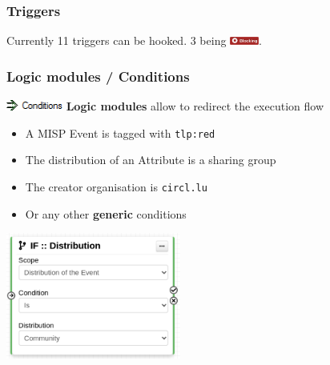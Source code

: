 \begin{frame}
    \frametitle{Triggers}
    Currently 11 triggers can be hooked. 3 being \includegraphics[width=36px]{pictures/blocking-workflow.png}.
    \begin{center}
    \end{center}
\end{frame}

\begin{frame}
    \frametitle{Logic modules / Conditions}
    \vspace*{0.25em}
    \includegraphics[width=70px]{pictures/sc-condition.png}
    \vspace*{0.25em}
    {\Large {}} \textbf{Logic modules} allow to redirect the execution flow
    \begin{itemize}
        \item A MISP Event is tagged with \texttt{tlp:red}
        \item The distribution of an Attribute is a sharing group
        \item The creator organisation is \texttt{circl.lu}
        \item Or any other \textbf{generic} conditions
    \end{itemize}

    \vspace*{0.5em}
    \begin{center}
        \includegraphics[width=0.43\textwidth]{pictures/logic-module.png}
    \end{center}
\end{frame}


